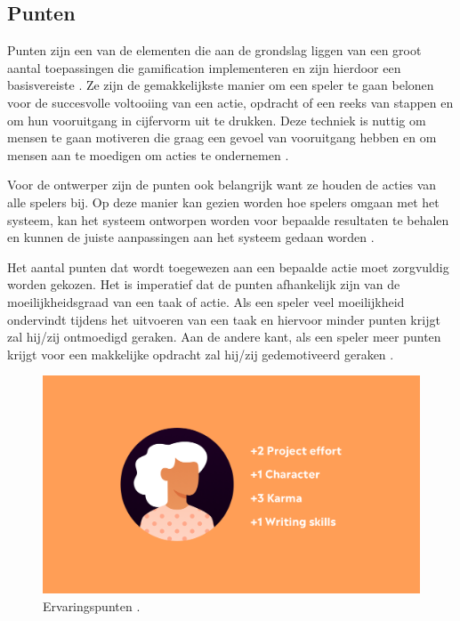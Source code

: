 \subsection{Punten}

Punten zijn een van de elementen die aan de grondslag liggen van een groot aantal toepassingen die gamification implementeren en zijn hierdoor een basisvereiste \autocite{Sailer2016}. Ze zijn de gemakkelijkste manier om een speler te gaan belonen voor de succesvolle voltooiing van een actie, opdracht of een reeks van stappen en om hun vooruitgang in cijfervorm uit te drukken. Deze techniek is nuttig om mensen te gaan motiveren die graag een gevoel van vooruitgang hebben en om mensen aan te moedigen om acties te ondernemen \autocite{Costa2019}.

Voor de ontwerper zijn de punten ook belangrijk want ze houden de acties van alle spelers bij. Op deze manier kan gezien worden hoe spelers omgaan met het systeem, kan het systeem ontworpen worden voor bepaalde resultaten te behalen en kunnen de juiste aanpassingen aan het systeem gedaan worden \autocite{Zichermann2011}.

Het aantal punten dat wordt toegewezen aan een bepaalde actie moet zorgvuldig worden gekozen. Het is imperatief dat de punten afhankelijk zijn van de moeilijkheidsgraad van een taak of actie. Als een speler veel moeilijkheid ondervindt tijdens het uitvoeren van een taak en hiervoor minder punten krijgt zal hij/zij ontmoedigd geraken. Aan de andere kant, als een speler meer punten krijgt voor een makkelijke opdracht zal hij/zij gedemotiveerd geraken \autocite{Costa2019}.

\begin{figure}
    \includegraphics[width=\linewidth]{Points.png}
    \caption{Ervaringspunten \autocite{Points2018}.}
    \label{fig:points}
\end{figure}

